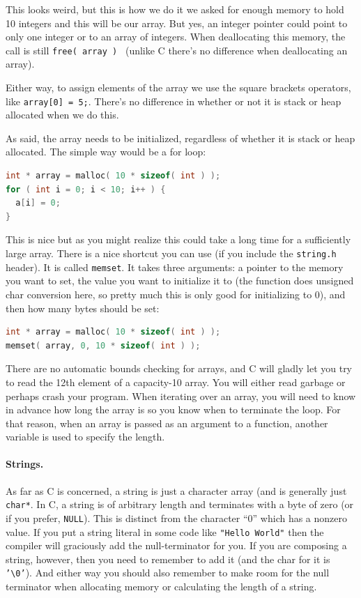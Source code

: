 \documentclass[a4paper]{report}
\newcommand{\Rplus}{\protect\hspace{-.1em}\protect\raisebox{.35ex}{\smaller{\smaller\textbf{+}}}}
\newcommand{\Cpp}{\mbox{C\Rplus\Rplus}\xspace}
\begin{document}
This looks weird, but this is how we do it we asked for enough memory to hold 10 integers and this will be our array. But yes, an integer pointer could point to only one integer or to an array of integers. When deallocating this memory, the call is still \texttt{free( array ) } (unlike \Cpp there's no difference when deallocating an array).

Either way, to assign elements of the array we use the square brackets operators, like \texttt{array[0] = 5;}. There's no difference in whether or not it is stack or heap allocated when we do this.

As said, the array needs to be initialized, regardless of whether it is stack or heap allocated. The simple way would be a for loop:

\begin{lstlisting}[language=C]
int * array = malloc( 10 * sizeof( int ) );
for ( int i = 0; i < 10; i++ ) {
  a[i] = 0;
}
\end{lstlisting}

This is nice but as you might realize this could take a long time for a sufficiently large array. There is a nice shortcut you can use (if you include the \texttt{string.h} header). It is called \texttt{memset}. It takes three arguments: a pointer to the memory you want to set, the value you want to initialize it to (the function does unsigned char conversion here, so pretty much this is only good for initializing to 0), and then how many bytes should be set:

\begin{lstlisting}[language=C]
int * array = malloc( 10 * sizeof( int ) );
memset( array, 0, 10 * sizeof( int ) );
\end{lstlisting}

There are no automatic bounds checking for arrays, and C will gladly let you try to read the 12th element of a capacity-10 array. You will either read garbage or perhaps crash your program. When iterating over an array, you will need to know in advance how long the array is so you know when to terminate the loop. For that reason, when an array is passed as an argument to a function, another variable is used to specify the length.

\paragraph{Strings.}

As far as C is concerned, a string is just a character array (and is generally just \texttt{char*}. In C, a string is of arbitrary length and terminates with a byte of zero (or if you prefer, \texttt{NULL}). This is distinct from the character ``0'' which has a nonzero value. If you put a string literal in some code like \texttt{"Hello World"} then the compiler will graciously add the null-terminator for you. If you are composing a string, however, then you need to remember to add it (and the char for it is \texttt{'\textbackslash0'}). And either way you should also remember to make room for the null terminator when allocating memory or calculating the length of a string.
\end{document}

